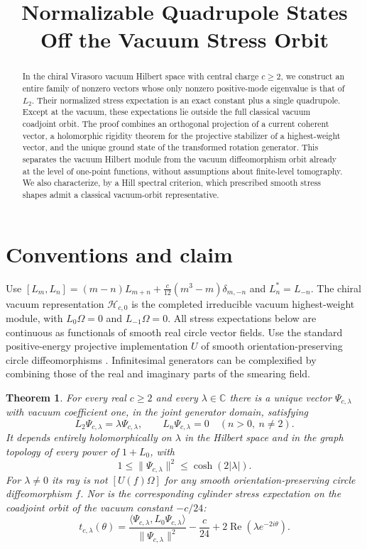 \documentclass[11pt]{article}
\newtheorem{theorem}{Theorem}
\newcommand{\Om}{\Omega}
\begin{document}
\title{Normalizable Quadrupole States Off the Vacuum Stress Orbit}
\author{}
\date{}
\maketitle
\begin{abstract}
In the chiral Virasoro vacuum Hilbert space with central charge $c\geq2$, we construct an entire family of nonzero vectors whose only nonzero positive-mode eigenvalue is that of $L_2$. Their normalized stress expectation is an exact constant plus a single quadrupole. Except at the vacuum, these expectations lie outside the full classical vacuum coadjoint orbit. The proof combines an orthogonal projection of a current coherent vector, a holomorphic rigidity theorem for the projective stabilizer of a highest-weight vector, and the unique ground state of the transformed rotation generator. This separates the vacuum Hilbert module from the vacuum diffeomorphism orbit already at the level of one-point functions, without assumptions about finite-level tomography. We also characterize, by a Hill spectral criterion, which prescribed smooth stress shapes admit a classical vacuum-orbit representative.
\end{abstract}

\section{Conventions and claim}
Use $[L_m,L_n]=(m-n)L_{m+n}+\frac{c}{12}(m^3-m)\delta_{m,-n}$ and $L_n^*=L_{-n}$. The chiral vacuum representation $\mathcal H_{c,0}$ is the completed irreducible vacuum highest-weight module, with $L_0\Om=0$ and $L_{-1}\Om=0$. All stress expectations below are continuous as functionals of smooth real circle vector fields. Use the standard positive-energy projective implementation $U$ of smooth orientation-preserving circle diffeomorphisms \cite{carpi,fewster}. Infinitesimal generators can be complexified by combining those of the real and imaginary parts of the smearing field.

\begin{theorem}\label{main}
For every real $c\geq2$ and every $\lambda\in\mathbb C$ there is a unique vector $\Psi_{c,\lambda}$ with vacuum coefficient one, in the joint generator domain, satisfying
\[
L_2\Psi_{c,\lambda}=\lambda\Psi_{c,\lambda},\qquad
L_n\Psi_{c,\lambda}=0\quad(n>0,\ n\ne2).
\]
It depends entirely holomorphically on $\lambda$ in the Hilbert space and in the graph topology of every power of $1+L_0$, with
\[
1\le\|\Psi_{c,\lambda}\|^2\le\cosh(2|\lambda|).
\]
For $\lambda\ne0$ its ray is not $[U(f)\Om]$ for any smooth orientation-preserving circle diffeomorphism $f$. Nor is the corresponding cylinder stress expectation on the coadjoint orbit of the vacuum constant $-c/24$:
\[
t_{c,\lambda}(\theta)=
\frac{\langle\Psi_{c,\lambda},L_0\Psi_{c,\lambda}\rangle}{\|\Psi_{c,\lambda}\|^2}
-\frac{c}{24}+2\operatorname{Re}(\lambda e^{-2i\theta}).
\]
\end{theorem}
\end{document}
